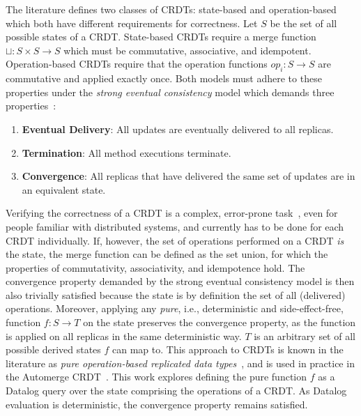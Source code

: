 The literature defines two classes of \acp{CRDT}: state-based and operation-based
which both have different requirements for correctness.
Let \( S \) be the set of all possible states of a \ac{CRDT}.
State-based \acp{CRDT} require a merge function \( \sqcup: S \times S \to S \)
which must be commutative, associative, and idempotent.
Operation-based \acp{CRDT} require that the operation functions \( op_i: S \to S \)
are commutative and applied exactly once.
Both models must adhere to these properties under the \emph{strong eventual consistency}
model which demands three properties~\cite{shapiro2011comprehensive}:

\begin{enumerate}
    \item \textbf{Eventual Delivery}: All updates are eventually delivered to
          all replicas.
    \item \textbf{Termination}: All method executions terminate.
    \item \textbf{Convergence}: All replicas that have delivered the same set of
          updates are in an equivalent state.
\end{enumerate}

Verifying the correctness of a \ac{CRDT} is a complex,
error-prone task~\cite{gomes2017verifying, kleppmann2022assessing},
even for people familiar with distributed systems,
and currently has to be done for each \ac{CRDT} individually.
If, however, the set of operations performed on a \ac{CRDT} \emph{is} the state,
the merge function can be defined as the set union,
for which the properties of commutativity, associativity, and idempotence hold.
The convergence property demanded by the strong eventual consistency
model is then also trivially satisfied because the state is by definition
the set of all (delivered) operations.
Moreover, applying any \emph{pure}, i.e., deterministic and side-effect-free,
function \( f: S \to T \) on the state preserves the convergence property,
as the function is applied on all replicas in the same deterministic way.
\( T \) is an arbitrary set of all possible derived states \( f \) can map to.
This approach to \acp{CRDT} is known in the literature as
\emph{pure operation-based replicated data types}~\cite{baquero2017pure, stewen2024undo},
and is used in practice in the Automerge \ac{CRDT}~\cite{automerge}.
This work explores defining the pure function \( f \) as a Datalog query
over the state comprising the operations of a \ac{CRDT}.
As Datalog evaluation is deterministic, the convergence property remains satisfied.

